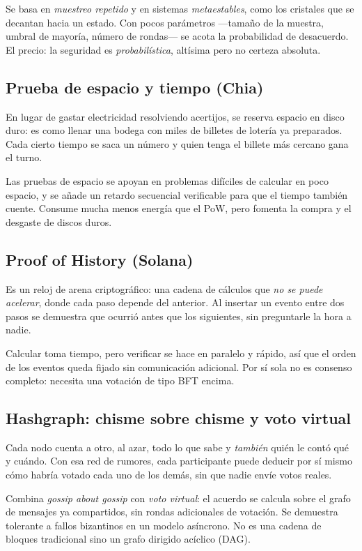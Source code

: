 \documentclass[11pt,a4paper]{article}
\theoremstyle{definition}
\theoremstyle{plain}
\theoremstyle{remark}
\begin{document}
Se basa en \emph{muestreo repetido} y en sistemas \emph{metaestables}, como los
cristales que se decantan hacia un estado. Con pocos parámetros —tamaño de la
muestra, umbral de mayoría, número de rondas— se acota la probabilidad de
desacuerdo. El precio: la seguridad es \emph{probabilística}, altísima pero no
certeza absoluta.

\subsection{Prueba de espacio y tiempo (Chia)}

En lugar de gastar electricidad resolviendo acertijos, se reserva espacio en
disco duro: es como llenar una bodega con miles de billetes de lotería ya
preparados. Cada cierto tiempo se saca un número y quien tenga el billete más
cercano gana el turno.

Las pruebas de espacio se apoyan en problemas difíciles de calcular en poco
espacio, y se añade un retardo secuencial verificable para que el tiempo también
cuente. Consume mucha menos energía que el PoW, pero fomenta la compra y el
desgaste de discos duros.

\subsection{Proof of History (Solana)}

Es un reloj de arena criptográfico: una cadena de cálculos que \emph{no se puede
acelerar}, donde cada paso depende del anterior. Al insertar un evento entre dos
pasos se demuestra que ocurrió antes que los siguientes, sin preguntarle la hora
a nadie.

Calcular toma tiempo, pero verificar se hace en paralelo y rápido, así que el
orden de los eventos queda fijado sin comunicación adicional. Por sí sola no es
consenso completo: necesita una votación de tipo BFT encima.

\subsection{Hashgraph: chisme sobre chisme y voto virtual}

Cada nodo cuenta a otro, al azar, todo lo que sabe y \emph{también} quién le
contó qué y cuándo. Con esa red de rumores, cada participante puede deducir por
sí mismo cómo habría votado cada uno de los demás, sin que nadie envíe votos
reales.

Combina \emph{gossip about gossip} con \emph{voto virtual}: el acuerdo se calcula
sobre el grafo de mensajes ya compartidos, sin rondas adicionales de votación. Se
demuestra tolerante a fallos bizantinos en un modelo asíncrono. No es una cadena
de bloques tradicional sino un grafo dirigido acíclico (DAG).
\end{document}
